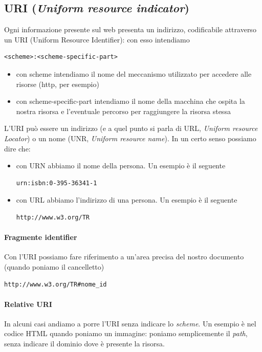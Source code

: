 \documentclass[11pt]{report}
\begin{document}
\subsection*{URI (\emph{Uniform resource indicator})}
Ogni informazione presente sul web presenta un indirizzo, codificabile attraverso un URI (Uniform Resource Identifier): con esso intendiamo
\begin{verbatim}<scheme>:<scheme-specific-part>\end{verbatim}
\begin{itemize}
\item con scheme intendiamo il nome del meccanismo utilizzato per accedere alle risorse (http, per esempio)
\item con scheme-specific-part intendiamo il nome della macchina che ospita la nostra risorsa e l'eventuale percorso per raggiungere la risorsa stessa
\end{itemize}
L'URI può essere un indirizzo (e a quel punto si parla di URL, \emph{Uniform resource Locator}) o un nome (UNR, \emph{Uniform resource name}). In un certo senso possiamo dire che:
\begin{itemize}
\item con URN abbiamo il nome della persona. Un esempio è il seguente
\begin{verbatim}
urn:isbn:0-395-36341-1
\end{verbatim}
\item con URL abbiamo l'indirizzo di una persona. Un esempio è il seguente
\begin{verbatim}
http://www.w3.org/TR
\end{verbatim}
\end{itemize}
\paragraph{Fragmente identifier} Con l'URI possiamo fare riferimento a un'area precisa del nostro documento (quando poniamo il cancelletto)
\begin{verbatim}
http://www.w3.org/TR#nome_id
\end{verbatim}
\paragraph{Relative URI} In alcuni casi andiamo a porre l'URI senza indicare lo \emph{scheme}. Un esempio è nel codice HTML quando poniamo un immagine: poniamo semplicemente il \emph{path}, senza indicare il dominio dove è presente la risorsa.
\end{document}
